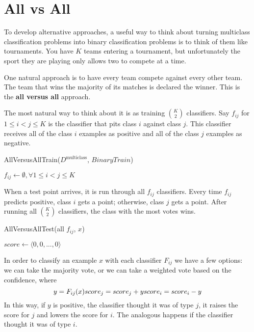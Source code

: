 \section{All vs All}
To develop alternative approaches, a useful way to think about turning multiclass classification problems into binary classification problems is to think of them like tournaments. You have \(K\) teams entering a tournament, but unfortunately the sport they are playing only allows two to compete at a time. 

One natural approach is to have every team compete against every other team. The team that wins the majority of its matches is declared the winner. This is the \textbf{all versus all} approach.

The most natural way to think about it is as training \(K \choose 2\) classifiers. Say \(f_{ij}\) for \(1 \leq i < j \leq K\) is the classifier that pits class \(i\) against class \(j\). This classifier receives all of the class \(i\) examples as positive and all of the class \(j\) examples as negative.

\begin{algorithm}
\caption{AllVersusAllTrain($D^\text{multiclass}$, $BinaryTrain$)}
\label{alg:avatrain}
$f_{ij} \gets \emptyset, \forall 1 \leq i < j \leq K$\;
\end{algorithm}

When a test point arrives, it is run through all \(f_{ij}\) classifiers. Every time \(f_{ij}\) predicts positive, class \(i\) gets a point; otherwise, class \(j\) gets a point. After running all \(K \choose 2\) classifiers, the class with the most votes wins.

\begin{algorithm}
\caption{AllVersusAllTest(all $f_{ij}$, $x$)}
\label{alg:avatest}
$score \gets \langle 0, 0, ..., 0 \rangle$\;
\end{algorithm}

In order to classify an example \(x\) with each classifier \(F_{ij}\) we have a few options: we can take the majority vote, or we can take a weighted vote based on the confidence, where
\begin{equation*}
	y = F_{ij}(x)\\
	score_j = score_j + y\\
	score_i = score_i - y
\end{equation*}
In this way, if \(y\) is positive, the classifier thought it was of type \(j\), it raises the score for \(j\) and lowers the score for \(i\). The analogous happens if the classifier thought it was of type \(i\).

